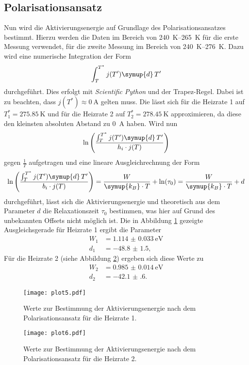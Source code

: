 \subsection{Polarisationsansatz}
\label{sec:grT}
Nun wird die Aktivierungsenergie auf Grundlage des Polarisationsansatzes bestimmt.
Hierzu werden die Daten im Bereich von \SIrange{240}{265}{\kelvin} für die erste Messung verwendet, für die zweite Messung im Bereich von \SIrange{240}{276}{\kelvin}.
Dazu wird eine numerische Integration der Form
\begin{equation}
    \label{eqn:int}
    \int_T^{T^*} j(T') \symup{d}\,T'
\end{equation}
durchgeführt. Dies erfolgt mit \textit{Scientific Python} \cite{scipy} und der Trapez-Regel. Dabei ist zu beachten, dass $j(T^*) \approx \SI{0}{\ampere}$ gelten muss.
Die lässt sich für die Heizrate 1 auf $T^*_1 = \SI{275.85}{\kelvin}$ und für die Heizrate 2 auf $T^*_2 = \SI{278.45}{\kelvin}$ approximieren, da diese den kleinsten absoluten Abstand zu \SI{0}{\ampere} haben.
Wird nun
\begin{equation*}
    \ln\left(\frac{\int_T^{T^*} j(T') \symup{d}\,T'}{h_i \cdot j(T)}\right)
\end{equation*}
gegen $\frac{1}{T}$ aufgetragen und eine lineare Ausgleichrechnung der Form
\begin{equation}
    \label{eqn:lin2}
    \ln\left(\frac{\int_T^{T^*} j(T') \symup{d}\,T'}{b_i \cdot j(T)}\right) = \frac{W}{\symup{k_B} \cdot T} + \ln(\tau_0) = \frac{W}{\symup{k_B} \cdot T} + d
\end{equation}
durchgeführt, lässt sich die Aktivierungsenergie und theoretisch aus dem Parameter $d$ die Relaxationszeit $\tau_0$ bestimmen, was hier auf Grund des unbekannten Offsets nicht möglich ist.
Die in Abbildung \ref{fig:plot5} gezeigte Ausgleichsgerade für Heizrate 1 ergibt die Parameter
\begin{align*}
    W_1 &= \SI{1.114(33)}{\electronvolt} \\
    d_1 &= \num{-48.8(15)},
\end{align*}
Für die Heizrate 2 (siehe Abbildung \ref{fig:plot6}) ergeben sich diese Werte zu
\begin{align*}
    W_2 &= \SI{0.985(14)}{\electronvolt} \\
    d_2 &= \num{-42.1(6)}.
\end{align*}

\begin{figure}
  \centering
  \texttt{[image: plot5.pdf]}
  \caption{Werte zur Bestimmung der Aktivierungsenergie nach dem Polarisationsansatz für die Heizrate 1.}
  \label{fig:plot5}
\end{figure}
\begin{figure}
  \centering
  \texttt{[image: plot6.pdf]}
  \caption{Werte zur Bestimmung der Aktivierungsenergie nach dem Polarisationsansatz für die Heizrate 2.}
  \label{fig:plot6}
\end{figure}
\FloatBarrier


